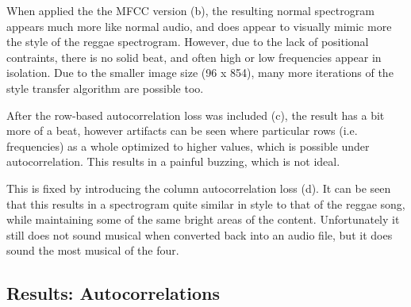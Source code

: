\documentclass{article}
\begin{document}
When applied the the MFCC version (b), the resulting normal spectrogram appears much more like normal audio, and does appear to visually mimic more the style of the reggae spectrogram. However, due to the lack of positional contraints, there is no solid beat, and often high or low frequencies appear in isolation. Due to the smaller image size (96 x 854), many more iterations of the style transfer algorithm are possible too.

After the row-based autocorrelation loss was included (c), the result has a bit more of a beat, however artifacts can be seen where particular rows (i.e. frequencies) as a whole optimized to higher values, which is possible under autocorrelation. This results in a painful buzzing, which is not ideal. 

This is fixed by introducing the column autocorrelation loss (d). It can be seen that this results in a spectrogram quite similar in style to that of the reggae song, while maintaining some of the same bright areas of the content. Unfortunately it still does not sound musical when converted back into an audio file, but it does sound the most musical of the four.

\subsection{Results: Autocorrelations}
\end{document}
